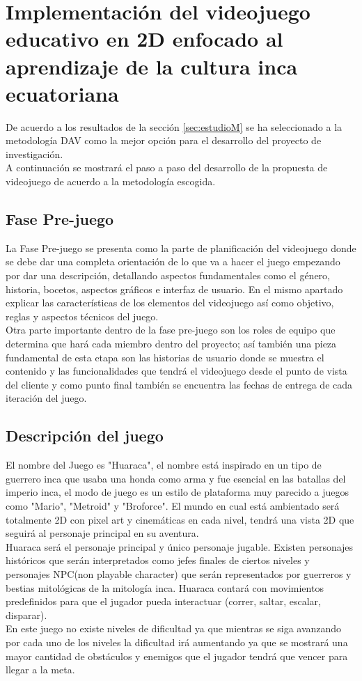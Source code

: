 \documentclass[a4paper, openright, 12pt]{report}
\begin{document}
\section{Implementación del videojuego educativo en 2D enfocado al aprendizaje de la cultura inca ecuatoriana}
\justify
De acuerdo a los resultados de la sección \ref{sec:estudioM} se ha seleccionado a la metodología DAV como la mejor opción para el desarrollo del proyecto de investigación.\\
A continuación se mostrará el paso a paso del desarrollo de la propuesta de videojuego de acuerdo a la metodología escogida.

\subsection{Fase Pre-juego}
\justify
La Fase Pre-juego se presenta como la parte de planificación del videojuego donde se debe dar una completa orientación de lo que va a hacer el juego empezando por dar una descripción, detallando aspectos fundamentales como el género, historia, bocetos, aspectos gráficos e interfaz de usuario. En el mismo apartado explicar las características de los elementos del videojuego así como objetivo, reglas y aspectos técnicos del juego.\\
Otra parte importante dentro de la fase pre-juego son los roles de equipo que determina que hará cada miembro dentro del proyecto; así también una pieza fundamental de esta etapa son las historias de usuario donde se muestra el contenido y las funcionalidades que tendrá el videojuego desde el punto de vista del cliente y como punto final también se encuentra las fechas de entrega de cada iteración del juego.\\
\subsection*{Descripción del juego}
\justify
El nombre del Juego es "Huaraca", el nombre está inspirado en un tipo de guerrero inca que usaba una honda como arma y fue esencial en las batallas del imperio inca, el modo de juego es un estilo de plataforma muy parecido a juegos como "Mario", "Metroid" y "Broforce". El mundo en cual está ambientado será totalmente 2D con pixel art y cinemáticas en cada nivel, tendrá una vista 2D que seguirá al personaje principal en su aventura.\\
Huaraca será el personaje principal y único personaje jugable. Existen personajes históricos que serán interpretados como jefes finales de ciertos niveles y personajes NPC(non playable character) que serán representados por guerreros y bestias mitológicas de la mitología inca.
Huaraca contará con movimientos predefinidos para que el jugador pueda interactuar (correr, saltar, escalar, disparar).\\
En este juego no existe niveles de dificultad ya que mientras se siga avanzando por cada uno de los niveles la dificultad irá aumentando ya que se mostrará una mayor cantidad de obstáculos y enemigos que el jugador tendrá que vencer para llegar a la meta.
 
\end{document}
